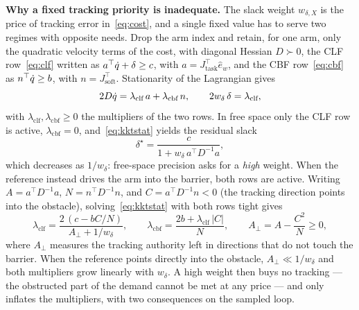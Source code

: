 \textbf{Why a fixed tracking priority is inadequate.} The slack weight $w_{\delta,X}$ is the price of tracking error in~\eqref{eq:cost}, and a single fixed value has to serve two regimes with opposite needs. Drop the arm index and retain, for one arm, only the quadratic velocity terms of the cost, with diagonal Hessian $D \succ 0$, the CLF row~\eqref{eq:clf} written as $a^{\top}\dot{q} + \delta \ge c$, with $a = J_{\text{task}}^{\top}\hat{e}_w$, and the CBF row~\eqref{eq:cbf} as $n^{\top}\dot{q} \ge b$, with $n = J_{\text{soft}}^{\top}$. Stationarity of the Lagrangian gives
\begin{equation}
2D\dot{q} = \lambda_{\text{clf}}\,a + \lambda_{\text{cbf}}\,n,
\qquad
2w_{\delta}\,\delta = \lambda_{\text{clf}},
\label{eq:kktstat}
\end{equation}
with $\lambda_{\text{clf}}, \lambda_{\text{cbf}} \ge 0$ the multipliers of the two rows. In free space only the CLF row is active, $\lambda_{\text{cbf}} = 0$, and~\eqref{eq:kktstat} yields the residual slack
\begin{equation}
\delta^{\star} = \frac{c}{1 + w_{\delta}\,a^{\top}D^{-1}a},
\label{eq:freeslack}
\end{equation}
which decreases as $1/w_{\delta}$: free-space precision asks for a \emph{high} weight. When the reference instead drives the arm into the barrier, both rows are active. Writing $A = a^{\top}D^{-1}a$, $N = n^{\top}D^{-1}n$, and $C = a^{\top}D^{-1}n < 0$ (the tracking direction points into the obstacle), solving~\eqref{eq:kktstat} with both rows tight gives
\begin{equation}
\lambda_{\text{clf}} = \frac{2\,(c - bC/N)}{A_{\perp} + 1/w_{\delta}},
\qquad
\lambda_{\text{cbf}} = \frac{2b + \lambda_{\text{clf}}\,\lvert C\rvert}{N},
\qquad
A_{\perp} = A - \frac{C^2}{N} \ge 0,
\label{eq:kktconflict}
\end{equation}
where $A_{\perp}$ measures the tracking authority left in directions that do not touch the barrier. When the reference points directly into the obstacle, $A_{\perp} \ll 1/w_{\delta}$ and both multipliers grow linearly with $w_{\delta}$. A high weight then buys no tracking --- the obstructed part of the demand cannot be met at any price --- and only inflates the multipliers, with two consequences on the sampled loop.

